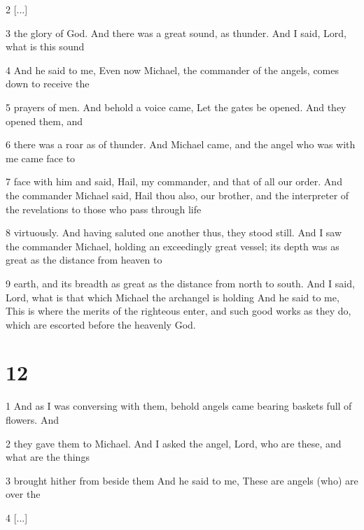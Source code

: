 \par 2 [...]

\par 3 the glory of God. And there was a great sound, as thunder. And I said, Lord, what is this sound

\par 4 And he said to me, Even now Michael, the commander of the angels, comes down to receive the

\par 5 prayers of men. And behold a voice came, Let the gates be opened. And they opened them, and

\par 6 there was a roar as of thunder. And Michael came, and the angel who was with me came face to

\par 7 face with him and said, Hail, my commander, and that of all our order. And the commander Michael said, Hail thou also, our brother, and the interpreter of the revelations to those who pass through life

\par 8 virtuously. And having saluted one another thus, they stood still. And I saw the commander Michael, holding an exceedingly great vessel; its depth was as great as the distance from heaven to

\par 9 earth, and its breadth as great as the distance from north to south. And I said, Lord, what is that which Michael the archangel is holding And he said to me, This is where the merits of the righteous enter, and such good works as they do, which are escorted before the heavenly God.

\chapter{12}

\par 1 And as I was conversing with them, behold angels came bearing baskets full of flowers. And

\par 2 they gave them to Michael. And I asked the angel, Lord, who are these, and what are the things

\par 3 brought hither from beside them And he said to me, These are angels (who) are over the 

\par 4 [...]

